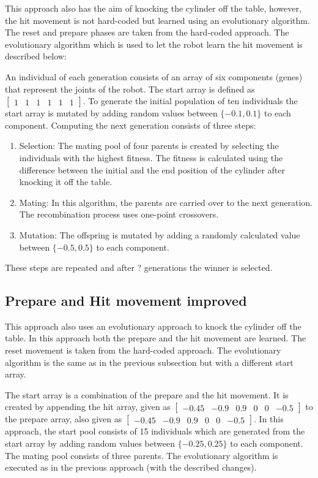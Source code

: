 This approach also has the aim of knocking the cylinder off the table, however, the hit movement is not hard-coded but learned using an evolutionary algorithm. The reset and prepare phases are taken from the hard-coded approach.
The evolutionary algorithm which is used to let the robot learn the hit movement is described below: 

An individual of each generation consists of an array of six components (genes) that represent the joints of the robot. The start array is defined as $\begin{bmatrix}
				1 & 1 & 1 & 1 & 1 & 1
				\end{bmatrix}$.
To generate the initial population of ten individuals the start array is mutated by adding random values between $\{-0.1,0.1\}$ to each component.
Computing the next generation consists of three steps:
\begin{enumerate}
\item Selection: The mating pool of four parents is created by selecting the individuals with the highest fitness. The fitness is calculated using the difference between the initial and the end position of the cylinder after knocking it off the table.

\item Mating: In this algorithm, the parents are carried over to the next generation. The recombination process uses one-point crossovers. 

\item Mutation: The offspring is mutated by adding a randomly calculated value between $\{-0.5,0.5\}$ to each component.
\end{enumerate}

These steps are repeated and after ? generations the winner is selected.

\subsection{Prepare and Hit movement improved} 

This approach also uses an evolutionary approach to knock the cylinder off the table. In this approach both the prepare and the hit movement are learned. The reset movement is taken from the hard-coded approach. The evolutionary algorithm is the same as in the previous subsection but with a different start array. 

The start array is a combination of the prepare and the hit movement. It is  created by appending the hit array, given as  
$\begin{bmatrix}
-0.45 &  -0.9 & 0.9 & 0 & 0 & -0.5
\end{bmatrix}$ 
to the prepare array, also given as
$\begin{bmatrix}
-0.45 &  -0.9 & 0.9 & 0 & 0 & -0.5
\end{bmatrix}$.
In this approach, the start pool consists of 15 individuals which are generated from the start array by adding random values between $\{-0.25,0.25\}$ to each component. The mating pool consists of three parents.
The evolutionary algorithm is executed as in the previous approach (with the described changes).

